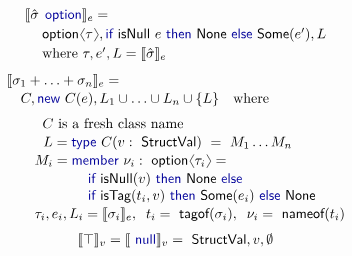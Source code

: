 \documentclass[preprint]{sigplanconf}
\newcommand{\langl}{\begin{picture}(4.5,7)
\put(1.1,2.5){\rotatebox{60}{\line(1,0){5.5}}}
\put(1.1,2.5){\rotatebox{300}{\line(1,0){5.5}}}
\end{picture}}
\newcommand{\rangl}{\begin{picture}(4.5,7)
\put(.9,2.5){\rotatebox{120}{\line(1,0){5.5}}}
\put(.9,2.5){\rotatebox{240}{\line(1,0){5.5}}}
\end{picture}}
\newcommand{\kvd}[1]{\textnormal{\textcolor{kvdclr}{\sffamily #1}}}
\newcommand{\ident}[1]{\textnormal{\sffamily #1}}
\newcommand{\tytagof}{\ident{tagof}}
\newcommand{\nameoftag}{\ident{nameof}}
\newcommand{\sem}[1]{\llbracket #1 \rrbracket}
\begin{document}
\begin{figure}
\begin{multicols}{2}
\noindent
\begin{equation*}
\begin{array}{l}
 \sem{\hat{\sigma}\;\,\kvd{option}}_e = \\[0.2em]
 \hspace{1.25em} \ident{option}\langl\tau\rangl, \kvd{if}~\ident{isNull}~e~\kvd{then}~\ident{None}~\kvd{else}~\ident{Some}(e'), L\\[0.2em] 
 \hspace{1.25em} \textnormal{where}~\tau, e', L = \sem{\hat{\sigma}}_e
\end{array}
\end{equation*}
%
\begin{equation*}
\begin{array}{l}
 \sem{\sigma_1 + \ldots + \sigma_n}_e = \\[0.1em]
 \quad C, \kvd{new}~C(e), L_1\cup\ldots\cup L_n\cup\{ L \}\quad\textnormal{where}\\[0.6em]
 \qquad \;\;C~\textnormal{is a fresh class name} \\[0.1em]
 \qquad \;\,\,L = \kvd{type}~C(v:\ident{StructVal})~=~M_1\ldots M_n \\[0.1em]
 \qquad M_i = \kvd{member}~\nu_i:\ident{option}\langl\tau_i\rangl=\\[0.1em]
 \hspace{5.8em}  \kvd{if}~\ident{isNull}(v)~\kvd{then}~\ident{None}~\kvd{else} \\
 \hspace{5.8em}  \kvd{if}~\ident{isTag}(t_i, v)~\kvd{then}~
     \ident{Some}(e_i)~\kvd{else}~\ident{None} \\[0.1em]
 \qquad \tau_i, e_i, L_i = \sem{\sigma_i}_e,\;\; t_i = \tytagof{(\sigma_i)},\;\; \nu_i=\nameoftag{(t_i)}
\end{array}
\end{equation*}
%
\begin{equation*}
\begin{array}{l}
 \sem{\top}_v = \sem{\kvd{null}}_v = \ident{StructVal}, v, \emptyset
\end{array}
\end{equation*}
\end{multicols}


\end{figure}
\end{document}
